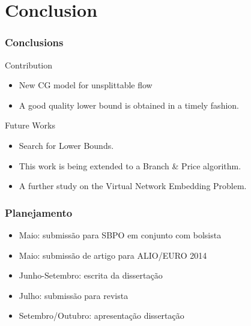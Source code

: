 \documentclass[english]{beamer}
\begin{document}
\section{Conclusion}
\begin{frame}
\frametitle{Conclusions}
Contribution
\begin{itemize}
	\item New CG model for unsplittable flow
	\item A good quality lower bound is obtained in a timely fashion.
\end{itemize}

Future Works
\begin{itemize}
	\item Search for Lower Bounds.
	\item This work is being extended to a Branch \& Price algorithm.
	\item A further study on the Virtual Network Embedding Problem.
\end{itemize}
\end{frame}
\begin{frame}
\frametitle{Planejamento}
\begin{itemize}
	\item Maio: submissão para SBPO em conjunto com bolsista
	\item Maio: submissão de artigo para ALIO/EURO 2014
	\item Junho-Setembro: escrita da dissertação
	\item Julho: submissão para revista
  \item Setembro/Outubro: apresentação dissertação
\end{itemize}
\end{frame}

\begin{frame}


\end{frame}
\end{document}
